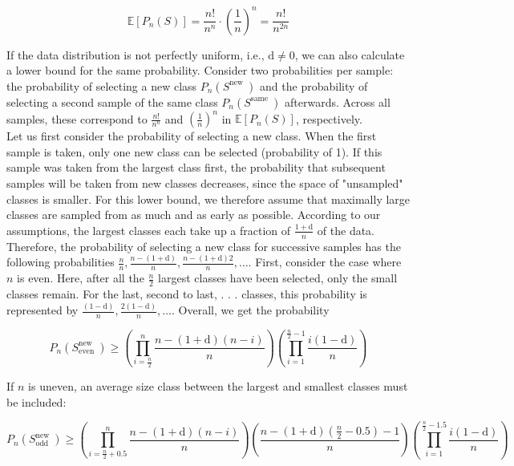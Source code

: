 \documentclass[10pt]{article}
\begin{document}
\begin{equation*}
\mathbb{E}\left[P_{n}(S)\right]=\frac{n!}{n^{n}} \cdot\left(\frac{1}{n}\right)^{n}=\frac{n!}{n^{2 n}} \tag{2}
\end{equation*}


If the data distribution is not perfectly uniform, i.e., $\mathrm{d} \neq 0$, we can also calculate a lower bound for the same probability. Consider two probabilities per sample: the probability of selecting a new class $P_{n}\left(S^{\text {new }}\right)$ and the probability of selecting a second sample of the same class $P_{n}\left(S^{\text {same }}\right)$ afterwards. Across all samples, these correspond to $\frac{n!}{n^{n}}$ and $\left(\frac{1}{n}\right)^{n}$ in $\mathbb{E}\left[P_{n}(S)\right]$, respectively.\\
Let us first consider the probability of selecting a new class. When the first sample is taken, only one new class can be selected (probability of 1). If this sample was taken from the largest class first, the probability that subsequent samples will be taken from new classes decreases, since the space of "unsampled" classes is smaller. For this lower bound, we therefore assume that maximally large classes are sampled from as much and as early as possible. According to our assumptions, the largest classes each take up a fraction of $\frac{1+\mathrm{d}}{n}$ of the data. Therefore, the probability of selecting a new class for successive samples has the following probabilities $\frac{n}{n}, \frac{n-(1+\mathrm{d})}{n}, \frac{n-(1+\mathrm{d}) 2}{n}, \ldots$. First, consider the case where $n$ is even. Here, after all the $\frac{n}{2}$ largest classes have been selected, only the small classes remain. For the last, second to last, . . . classes, this probability is represented by $\frac{(1-\mathrm{d})}{n}, \frac{2(1-\mathrm{d})}{n}, \ldots$. Overall, we get the probability

$$
P_{n}\left(S_{\text {even }}^{\text {new }}\right) \geq\left(\prod_{i=\frac{n}{2}}^{n} \frac{n-(1+\mathrm{d})(n-i)}{n}\right)\left(\prod_{i=1}^{\frac{n}{2}-1} \frac{i(1-\mathrm{d})}{n}\right)
$$

If $n$ is uneven, an average size class between the largest and smallest classes must be included:

$$
P_{n}\left(S_{\text {odd }}^{\text {new }}\right) \geq\left(\prod_{i=\frac{n}{2}+0.5}^{n} \frac{n-(1+\mathrm{d})(n-i)}{n}\right)\left(\frac{n-(1+\mathrm{d})\left(\frac{n}{2}-0.5\right)-1}{n}\right)\left(\prod_{i=1}^{\frac{n}{2}-1.5} \frac{i(1-\mathrm{d})}{n}\right)
$$
\end{document}
